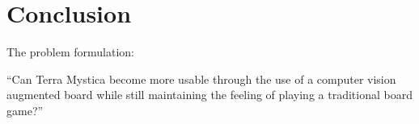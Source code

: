\chapter{Conclusion}\label{ch:conclusion}

The problem formulation:
\begin{center}
“Can Terra Mystica become more usable through the use of a computer vision augmented board while still maintaining the feeling of playing a traditional board game?”
\end{center}


